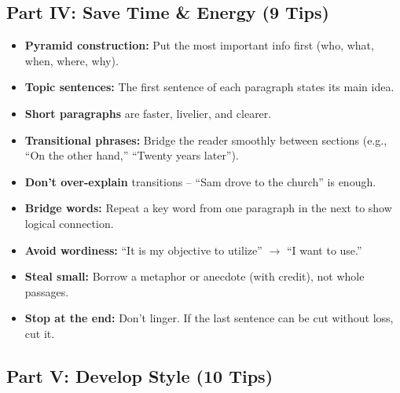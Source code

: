 \documentclass[12pt,a4paper]{article}
\begin{document}
\subsection{Part IV: Save Time \& Energy (9 Tips)}

\begin{itemize}[noitemsep]
    \item \textbf{Pyramid construction:} Put the most important info first (who, what, when, where, why).
    \item \textbf{Topic sentences:} The first sentence of each paragraph states its main idea.
    \item \textbf{Short paragraphs} are faster, livelier, and clearer.
    \item \textbf{Transitional phrases:} Bridge the reader smoothly between sections (e.g., ``On the other hand,'' ``Twenty years later'').
    \item \textbf{Don't over-explain} transitions -- ``Sam drove to the church'' is enough.
    \item \textbf{Bridge words:} Repeat a key word from one paragraph in the next to show logical connection.
    \item \textbf{Avoid wordiness:} ``It is my objective to utilize'' $\rightarrow$ ``I want to use.''
    \item \textbf{Steal small:} Borrow a metaphor or anecdote (with credit), not whole passages.
    \item \textbf{Stop at the end:} Don't linger. If the last sentence can be cut without loss, cut it.
\end{itemize}

\subsection{Part V: Develop Style (10 Tips)}
\end{document}
